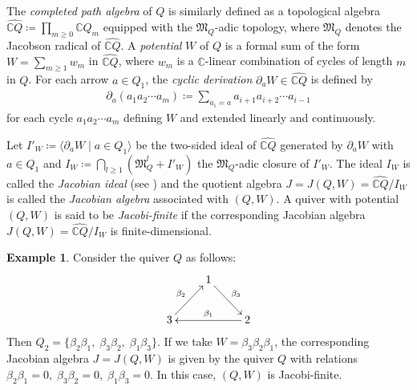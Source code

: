 \documentclass[12pt]{amsart}
\theoremstyle{definition}
\newtheorem{example}[theorem]{Example}
\theoremstyle{remark}
\numberwithin{equation}{section}
\begin{document}
The {\em completed path algebra} of $Q$ is similarly defined as a topological algebra $\widehat{\mathbb CQ} \coloneqq   \prod_{m\geq 0}\mathbb CQ_m$ equipped with the $\mathfrak{M}_Q$-adic topology, where $\mathfrak{M}_Q$ denotes the Jacobson radical of $\widehat{\mathbb CQ}$. A {\em potential} $W$ of $Q$ is a formal sum of the form $W=\sum_{m\geq 1}w_m$ in $\widehat{\mathbb CQ}$, where $w_m$ is a $\mathbb C$-linear combination of cycles of length $m$ in $Q$. For each arrow $a \in Q_1$, the \emph{cyclic derivation} $\partial_a W \in \widehat{\mathbb CQ}$ is defined by
\begin{eqnarray}\label{eqn:cyc-der}
    \partial_a (a_1a_2\cdots a_m) \coloneqq \sum_{a_i=a}a_{i+1}a_{i+2}\cdots a_{i-1}
\end{eqnarray}
for each cycle $a_1a_2\cdots a_m$ defining $W$ and extended linearly and continuously. 

Let $I'_W\coloneqq \langle \partial_a W\mid a\in Q_1\rangle$ be the  two-sided ideal of $\widehat{\mathbb CQ}$ generated by $\partial_a W$ with $a\in Q_1$ and $I_W\coloneqq \bigcap_{l\geq 1}(\mathfrak{M}_Q^l+I'_W)$ the $\mathfrak{M}_Q$-adic closure  of  $I'_W$.
The ideal $I_W$ is  called the {\em Jacobian ideal}  (see \cite[\S3, Definition~3.1]{DWZ08}) and the quotient algebra $J=J(Q,W)=\widehat{\mathbb CQ}/I_W$ is called the  {\em Jacobian algebra}  associated with $(Q,W)$. A quiver with potential $(Q,W)$ is said to be {\em Jacobi-finite} if the corresponding Jacobian algebra $J(Q,W)=\widehat{\mathbb CQ}/I_W$ is finite-dimensional.

\begin{example}
    Consider the quiver $Q$ as follows:
    $$\xymatrix{&1\ar[rd]^{\beta_3}&\\
3\ar[ru]^{\beta_2}&&2\ar[ll]_{\beta_1}}$$
Then  $Q_2=\{\beta_2\beta_1,\;\beta_3\beta_2,\;\beta_1\beta_3\}$. If we take $W=\beta_3\beta_2\beta_1$, the corresponding Jacobian algebra $J=J(Q,W)$ is given by the quiver $Q$ with relations $\beta_2\beta_1=0,\;\beta_3\beta_2=0,\;\beta_1\beta_3=0$. In this case, $(Q,W)$ is Jacobi-finite.
\end{example}
\end{document}

